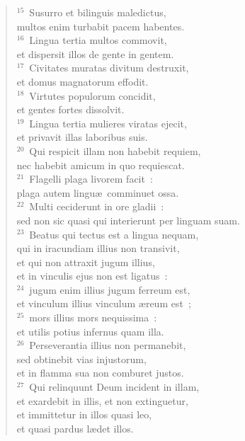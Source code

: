 \begin{flushleft}\begin{verse}${}^{15}$~Susurro et bilinguis maledictus,\\ multos enim turbabit pacem habentes.\\
${}^{16}$~Lingua tertia multos commovit,\\ et dispersit illos de gente in gentem.\\
${}^{17}$~Civitates muratas divitum destruxit,\\ et domus magnatorum effodit.\\
${}^{18}$~Virtutes populorum concidit,\\ et gentes fortes dissolvit.\\
${}^{19}$~Lingua tertia mulieres viratas ejecit,\\ et privavit illas laboribus suis.\\
${}^{20}$~Qui respicit illam non habebit requiem,\\ nec habebit amicum in quo requiescat.\\
${}^{21}$~Flagelli plaga livorem facit~:\\ plaga autem lingu\ae\ comminuet ossa.\\
${}^{22}$~Multi ceciderunt in ore gladii~:\\ sed non sic quasi qui interierunt per linguam suam.\\
${}^{23}$~Beatus qui tectus est a lingua nequam,\\ qui in iracundiam illius non transivit,\\ et qui non attraxit jugum illius,\\ et in vinculis ejus non est ligatus~:\\
${}^{24}$~jugum enim illius jugum ferreum est,\\ et vinculum illius vinculum \ae reum est~;\\
${}^{25}$~mors illius mors nequissima~:\\ et utilis potius infernus quam illa.\\
${}^{26}$~Perseverantia illius non permanebit,\\ sed obtinebit vias injustorum,\\ et in flamma sua non comburet justos.\\
${}^{27}$~Qui relinquunt Deum incident in illam,\\ et exardebit in illis, et non extinguetur,\\ et immittetur in illos quasi leo,\\ et quasi pardus l\ae det illos.\\

\end{verse}
\end{flushleft}

